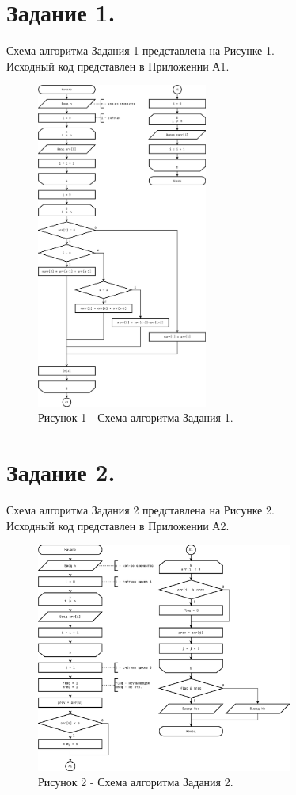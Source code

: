 \documentclass[oneside,a4paper,14pt]{extarticle}
\begin{document}
\section*{Задание 1.}
\noindent Схема алгоритма Задания 1 представлена на Рисунке 1.\\
\noindent Исходный код представлен в Приложении А1. \\
\begin{figure}[!ht]
	\centering
	\includegraphics[width=0.5\textwidth]{pics/flowchart-13.png}
	\caption*{Рисунок 1 - Схема алгоритма Задания 1.}
\end{figure}

\section*{Задание 2.}
\noindent Схема алгоритма Задания 2 представлена на Рисунке 2.\\
\noindent Исходный код представлен в Приложении А2. \\

\begin{figure}[!ht]
	\centering
	\includegraphics[width=0.75\textwidth]{pics/flowchart-14.png}
	\caption*{Рисунок 2 - Схема алгоритма Задания 2.}
\end{figure}
\end{document}
